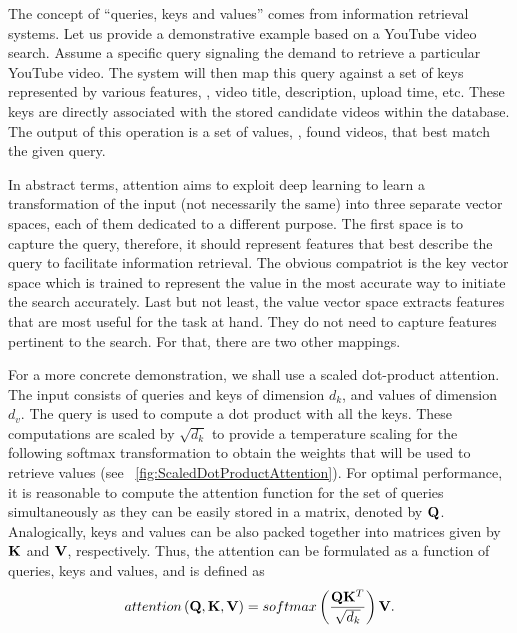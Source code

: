 The concept of ``queries, keys and values'' comes from information retrieval systems. Let us provide a demonstrative example based on a YouTube video search. Assume a specific query signaling the demand to retrieve a particular YouTube video. The system will then map this query against a set of keys represented by various features, \egtext{}, video title, description, upload time, etc. These keys are directly associated with the stored candidate videos within the database. The output of this operation is a set of values, \ietext{}, found videos, that best match the given query.

In abstract terms, attention aims to exploit deep learning to learn a transformation of the input (not necessarily the same) into three separate vector spaces, each of them dedicated to a different purpose. The first space is to capture the query, therefore, it should represent features that best describe the query to facilitate information retrieval. The obvious compatriot is the key vector space which is trained to represent the value in the most accurate way to initiate the search accurately. Last but not least, the value vector space extracts features that are most useful for the task at hand. They do not need to capture features pertinent to the search. For that, there are two other mappings.

For a more concrete demonstration, we shall use a scaled dot-product attention. The input consists of queries and keys of dimension $d_k$, and values of dimension $d_v$. The query is used to compute a dot product with all the keys. These computations are scaled by $\sqrt{d_k}$ to provide a temperature scaling for the following softmax transformation to obtain the weights that will be used to retrieve values (see \figtext{}~\ref{fig:ScaledDotProductAttention}). For optimal performance, it is reasonable to compute the attention function for the set of queries simultaneously as they can be easily stored in a matrix, denoted by $\mathbf{Q}$. Analogically, keys and values can be also packed together into matrices given by $\mathbf{K}$ and $\mathbf{V}$, respectively. Thus, the attention can be formulated as a function of queries, keys and values, and is defined as
\begin{equation}
    \label{eq:ScaledDotProductAttention}
    {attention} \left( \mathbf{Q}, \mathbf{K}, \mathbf{V} \right) =
    {softmax} \left( \frac{\mathbf{Q} \mathbf{K}^T}{\sqrt{d_k}} \right) \mathbf{V}.
\end{equation}

